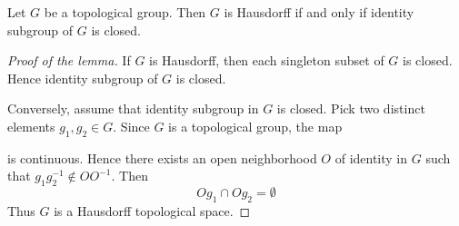 \documentclass[10pt]{amsart}
\begin{document}
\begin{lemma}\label{lemma:Hausdorff_topological_groups}
	Let $G$ be a topological group. Then $G$ is Hausdorff if and only if identity subgroup of $G$ is closed.
\end{lemma}
\begin{proof}[Proof of the lemma]
	If $G$ is Hausdorff, then each singleton subset of $G$ is closed. Hence identity subgroup of $G$ is closed.

	Conversely, assume that identity subgroup in $G$ is closed. Pick two distinct elements $g_1,g_2 \in G$. Since $G$ is a topological group, the map
	\begin{center}
	\end{center}
	is continuous. Hence there exists an open neighborhood $O$ of identity in $G$ such that $g_1g_2^{-1}\not \in OO^{-1}$. Then
	$$Og_1\cap Og_2 = \emptyset$$
	Thus $G$ is a Hausdorff topological space.
\end{proof}
\end{document}
